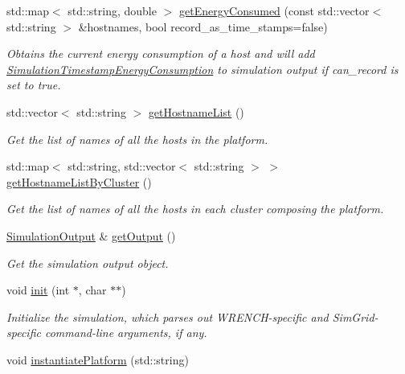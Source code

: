\begin{DoxyCompactItemize}
std\+::map$<$ std\+::string, double $>$ \hyperlink{classwrench_1_1_simulation_ae5ea0778a82f576168e00dd8e492623f}{get\+Energy\+Consumed} (const std\+::vector$<$ std\+::string $>$ \&hostnames, bool record\+\_\+as\+\_\+time\+\_\+stamps=false)
\begin{DoxyCompactList}\small\item\em Obtains the current energy consumption of a host and will add \hyperlink{classwrench_1_1_simulation_timestamp_energy_consumption}{Simulation\+Timestamp\+Energy\+Consumption} to simulation output if can\+\_\+record is set to true. \end{DoxyCompactList}\item 
std\+::vector$<$ std\+::string $>$ \hyperlink{classwrench_1_1_simulation_a15b4a28cfb0391525f3dba70317189be}{get\+Hostname\+List} ()
\begin{DoxyCompactList}\small\item\em Get the list of names of all the hosts in the platform. \end{DoxyCompactList}\item 
std\+::map$<$ std\+::string, std\+::vector$<$ std\+::string $>$ $>$ \hyperlink{classwrench_1_1_simulation_a3f4f62572877f3621bac3752839df6a2}{get\+Hostname\+List\+By\+Cluster} ()
\begin{DoxyCompactList}\small\item\em Get the list of names of all the hosts in each cluster composing the platform. \end{DoxyCompactList}\item 
\hyperlink{classwrench_1_1_simulation_output}{Simulation\+Output} \& \hyperlink{classwrench_1_1_simulation_aff0338aa6831c6ac252cf0673fe68f44}{get\+Output} ()
\begin{DoxyCompactList}\small\item\em Get the simulation output object. \end{DoxyCompactList}\item 
void \hyperlink{classwrench_1_1_simulation_a3c6d35f1f77f35cbc727ce31e5689992}{init} (int $\ast$, char $\ast$$\ast$)
\begin{DoxyCompactList}\small\item\em Initialize the simulation, which parses out W\+R\+E\+N\+C\+H-\/specific and Sim\+Grid-\/specific command-\/line arguments, if any. \end{DoxyCompactList}\item 
void \hyperlink{classwrench_1_1_simulation_ae22639abf6ede9f345b382f5ffe19b0e}{instantiate\+Platform} (std\+::string)
$$
\end{DoxyCompactItemize}
